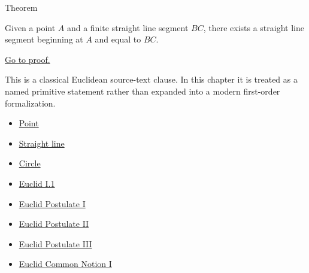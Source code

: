 \begin{theorembox}{Theorem}
\begin{theorem}
\label{thm:euclid-i-2}
Given a point $A$ and a finite straight line segment $BC$, there exists a
straight line segment beginning at $A$ and equal to $BC$.
\end{theorem}
\end{theorembox}
\begin{remark*}[Proof]
\hyperref[prf:euclid-i-2]{Go to proof.}
\end{remark*}
\begin{remark*}
This is a classical Euclidean source-text clause. In this chapter it is treated
as a named primitive statement rather than expanded into a modern first-order
formalization.
\end{remark*}
\begin{lra-not-visible}
\begin{dependencies}
\begin{itemize}
  \item \hyperref[def:euclid-point]{Point}
  \item \hyperref[def:euclid-straight-line]{Straight line}
  \item \hyperref[def:euclid-circle]{Circle}
  \item \hyperref[thm:euclid-i-1]{Euclid I.1}
  \item \hyperref[ax:euclid-postulate-draw-straight-line]{Euclid Postulate I}
  \item \hyperref[ax:euclid-postulate-produce-straight-line]{Euclid Postulate II}
  \item \hyperref[ax:euclid-postulate-describe-circle]{Euclid Postulate III}
  \item \hyperref[ax:euclid-common-notion-things-equal-to-same]{Euclid Common Notion I}
\end{itemize}
\end{dependencies}
\end{lra-not-visible}

